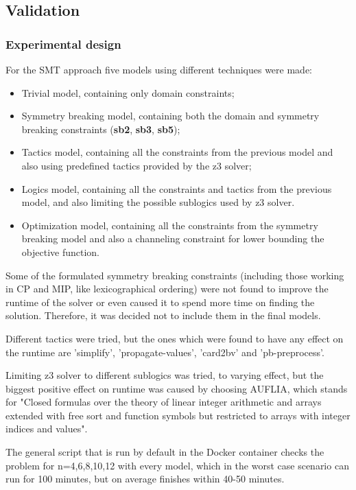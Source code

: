 \documentclass{article}
\begin{document}
\subsection{Validation}
\subsubsection{Experimental design}
For the SMT approach five models using different techniques were made:
\begin{itemize}
    \item Trivial model, containing only domain constraints;
    \item Symmetry breaking model, containing both the domain and symmetry breaking constraints (\textbf{sb2}, \textbf{sb3}, \textbf{sb5});
    \item Tactics model, containing all the constraints from the previous model and also using predefined tactics provided by the z3 solver;
    \item Logics model, containing all the constraints and tactics from the previous model, and also limiting the possible sublogics used by z3 solver.
    \item Optimization model, containing all the constraints from the symmetry breaking model and also a channeling constraint for lower bounding the objective function.
\end{itemize}

Some of the formulated symmetry breaking constraints (including those working in CP and MIP, like lexicographical ordering) were not found to improve the runtime of the solver or even caused it to spend more time on finding the solution. Therefore, it was decided not to include them in the final models.

Different tactics were tried, but the ones which were found to have any effect on the runtime are 'simplify', 'propagate-values', 'card2bv' and 'pb-preprocess'.

Limiting z3 solver to different sublogics was tried, to varying effect, but the biggest positive effect on runtime was caused by choosing AUFLIA, which stands for "Closed formulas over the theory of linear integer arithmetic and arrays extended with free sort and function symbols but restricted to arrays with integer indices and values".

The general script that is run by default in the Docker container checks the problem for n={4,6,8,10,12} with every model, which in the worst case scenario can run for 100 minutes, but on average finishes within 40-50 minutes.
\end{document}
